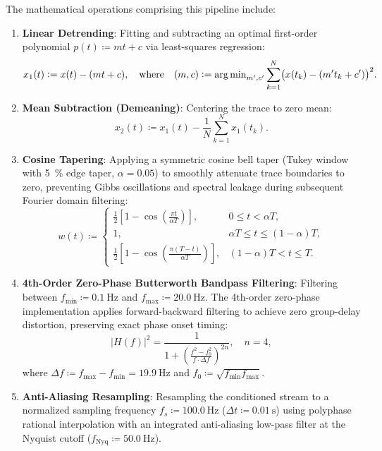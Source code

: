 The mathematical operations comprising this pipeline include:
\begin{enumerate}
  \item \textbf{Linear Detrending}: Fitting and subtracting an
    optimal first-order polynomial $p(t) \coloneqq m t + c$ via
    least-squares regression:
    \begin{equation}
      x_1(t) \mathrel{\mathop:}= x(t) - (m t + c), \quad \text{where} \quad
      (m, c) \mathrel{\mathop:}=
      \operatorname{arg\,min}_{m', c'}
      \sum_{k=1}^N \bigl( x(t_k) - (m' t_k + c') \bigr)^2.
    \end{equation}
  \item \textbf{Mean Subtraction (Demeaning)}: Centering the trace
    to zero mean:
    \begin{equation}
      x_2(t) \coloneqq x_1(t) - \frac{1}{N} \sum_{k=1}^N x_1(t_k).
    \end{equation}
  \item \textbf{Cosine Tapering}: Applying a symmetric cosine bell taper
    (Tukey window with \qty{5}{\percent} edge taper, $\alpha =
    \num{0.05}$) to smoothly attenuate
    trace boundaries to zero, preventing Gibbs oscillations and
    spectral leakage
    during subsequent Fourier domain filtering:
    \begin{equation}
      w(t) \coloneqq
      \begin{cases}
        \frac{1}{2}\left[ 1 - \cos\left( \frac{\pi t}{\alpha T}
        \right) \right], & 0 \le t < \alpha T, \\
        1, & \alpha T \le t \le (1 - \alpha) T, \\
        \frac{1}{2}\left[ 1 - \cos\left( \frac{\pi (T - t)}{\alpha
        T} \right) \right], & (1 - \alpha) T < t \le T.
      \end{cases}
    \end{equation}
  \item \textbf{4th-Order Zero-Phase Butterworth Bandpass Filtering}: Filtering
    between $f_{\mathrm{min}} \coloneqq \qty{0.1}{\hertz}$ and
    $f_{\mathrm{max}} \coloneqq \qty{20.0}{\hertz}$.
    The 4th-order zero-phase implementation applies forward-backward filtering
    to achieve zero group-delay distortion, preserving exact phase
    onset timing:
    \begin{equation}
      |H(f)|^2 = \frac{1}{1 + \left( \frac{f^2 - f_0^2}{f \cdot
      \Delta f} \right)^{2 n}}, \quad n = \num{4},
    \end{equation}
    where $\Delta f \coloneqq f_{\mathrm{max}} - f_{\mathrm{min}} =
    \qty{19.9}{\hertz}$
    and $f_0 \coloneqq \sqrt{f_{\mathrm{min}} f_{\mathrm{max}}}$.
  \item \textbf{Anti-Aliasing Resampling}: Resampling the
    conditioned stream to a
    normalized sampling frequency $f_s \coloneqq \qty{100.0}{\hertz}$
    ($\Delta t \coloneqq \qty{0.01}{\second}$)
    using polyphase rational interpolation with an integrated
    anti-aliasing low-pass
    filter at the Nyquist cutoff ($f_{\mathrm{Nyq}} \coloneqq
    \qty{50.0}{\hertz}$).
\end{enumerate}

